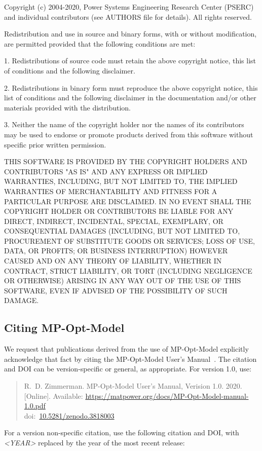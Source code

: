 \documentclass[12pt]{article}
\newcommand{\mpom}[0]{\mbox{MP-Opt-Model}}
\newcommand{\mpomname}[0]{\mpom{}}
\newcommand{\doi}[1]{doi:~\href{https://doi.org/#1}{#1}}
\numberwithin{equation}{section}
\numberwithin{table}{section}
\numberwithin{figure}{section}
\begin{document}
\begin{Notice}
Copyright (c) 2004-2020, Power Systems Engineering Research Center
(PSERC) and individual contributors (see AUTHORS file for details).
All rights reserved.

Redistribution and use in source and binary forms, with or without
modification, are permitted provided that the following conditions
are met:

1. Redistributions of source code must retain the above copyright
notice, this list of conditions and the following disclaimer.

2. Redistributions in binary form must reproduce the above copyright
notice, this list of conditions and the following disclaimer in the
documentation and/or other materials provided with the distribution.

3. Neither the name of the copyright holder nor the names of its
contributors may be used to endorse or promote products derived from
this software without specific prior written permission.

THIS SOFTWARE IS PROVIDED BY THE COPYRIGHT HOLDERS AND CONTRIBUTORS
"AS IS" AND ANY EXPRESS OR IMPLIED WARRANTIES, INCLUDING, BUT NOT
LIMITED TO, THE IMPLIED WARRANTIES OF MERCHANTABILITY AND FITNESS
FOR A PARTICULAR PURPOSE ARE DISCLAIMED. IN NO EVENT SHALL THE
COPYRIGHT HOLDER OR CONTRIBUTORS BE LIABLE FOR ANY DIRECT, INDIRECT,
INCIDENTAL, SPECIAL, EXEMPLARY, OR CONSEQUENTIAL DAMAGES (INCLUDING,
BUT NOT LIMITED TO, PROCUREMENT OF SUBSTITUTE GOODS OR SERVICES;
LOSS OF USE, DATA, OR PROFITS; OR BUSINESS INTERRUPTION) HOWEVER
CAUSED AND ON ANY THEORY OF LIABILITY, WHETHER IN CONTRACT, STRICT
LIABILITY, OR TORT (INCLUDING NEGLIGENCE OR OTHERWISE) ARISING IN
ANY WAY OUT OF THE USE OF THIS SOFTWARE, EVEN IF ADVISED OF THE
POSSIBILITY OF SUCH DAMAGE.
\end{Notice}

\clearpage
\subsection{Citing \mpom{}}

We request that publications derived from the use of \mpom{} explicitly acknowledge that fact by citing the \mpomname{} User's Manual~\cite{mpom_manual}.
The citation and DOI can be version-specific or general, as appropriate. For version 1.0, use:

\begin{quote}
\footnotesize
R.~D. Zimmerman. \mpomname{} User's Manual, Verision 1.0. 2020. [Online]. Available: \url{https://matpower.org/docs/MP-Opt-Model-manual-1.0.pdf}\\
\doi{10.5281/zenodo.3818003}
\end{quote}
For a version non-specific citation, use the following citation and DOI,
with \emph{\textless{}YEAR\textgreater{}} replaced by the year of the most recent release:
\end{document}
